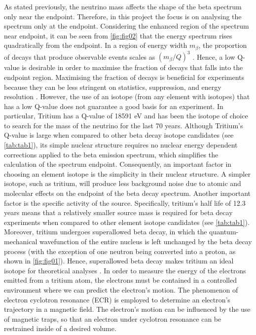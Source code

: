 \documentclass[a4paper,12pt, notitlepage]{article}
\begin{document}
As stated previously, the neutrino mass affects the shape of the beta spectrum only near the endpoint. Therefore, in this project the focus is on analysing the spectrum only at the endpoint. Considering the enhanced region of the spectrum near endpoint, it can be seen from \cref{fig:fig02} that the energy spectrum rises quadratically from the endpoint. In a region of energy width $m_{\beta}$, the proportion of decays that produce observable events scales as $(m_{\beta}/Q)^{3}$ \cite{Formaggio2021}. Hence, a low Q-value is desirable in order to maximise the fraction of decays that falls into the endpoint region. Maximising the fraction of decays is beneficial for experiments because they can be less stringent on statistics, suppression, and energy resolution \cite{Kopp2010}. However, the use of an isotope (from any element with isotopes) that has a low Q-value does not guarantee a good basis for an experiment.
In particular, Tritium has a Q-value of 18591 eV and has been the isotope of choice to search for the mass of the neutrino for the last 70 years. Although Tritium's Q-value is large when compared to other beta decay isotope candidates (see \cref{tab:tab1}), its simple nuclear structure requires no nuclear energy dependent corrections applied to the beta emission spectrum, which simplifies the calculation of the spectrum endpoint. Consequently, an important factor in choosing an element isotope is the simplicity in their nuclear structure. A simpler isotope, such as tritium, will produce less background noise due to atomic and molecular effects on the endpoint of the beta decay spectrum.
Another important factor is the specific activity of the source. Specifically, tritium's half life of 12.3 years means that a relatively smaller source mass is required for beta decay experiments when compared to other element isotope candidates (see \cref{tab:tab1}). Moreover, tritium undergoes superallowed beta decay, in which the quantum-mechanical wavefunction of the entire nucleus is left unchanged by the beta decay process (with the exception of one neutron being converted into a proton, as shown in \cref{fig:fig01}). Hence, superallowed beta decay makes tritium an ideal isotope for theoretical analyses \cite{Hardy2012}.
In order to measure the energy of the electrons emitted from a tritium atom, the electrons must be contained in a controlled environment where we can predict the electron's motion. The phenomenon of electron cyclotron resonance (ECR) is employed to determine an electron's trajectory in a magnetic field. The electron's motion can be influenced by the use of magnetic traps, so that an electron under cyclotron resonance can be restrained inside of a desired volume.
\end{document}
